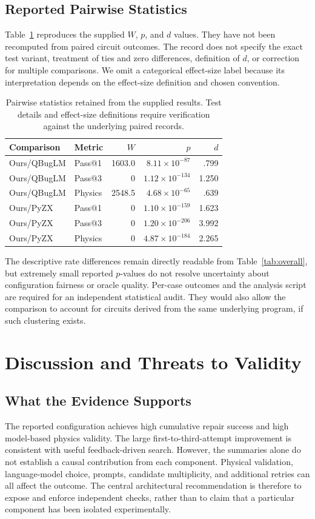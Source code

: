 \documentclass[conference]{IEEEtran}
\begin{document}
\subsection{Reported Pairwise Statistics}
Table~\ref{tab:stats} reproduces the supplied $W$, $p$, and $d$ values. They have not been recomputed from paired circuit outcomes. The record does not specify the exact test variant, treatment of ties and zero differences, definition of $d$, or correction for multiple comparisons. We omit a categorical effect-size label because its interpretation depends on the effect-size definition and chosen convention.

\begin{table}[t]
\caption{Pairwise statistics retained from the supplied results. Test details and effect-size definitions require verification against the underlying paired records.}
\label{tab:stats}
\centering\scriptsize
\begin{tabular}{@{}llrrr@{}}
\toprule
Comparison & Metric & $W$ & $p$ & $d$\\
\midrule
Ours/QBugLM & Pass@1 & 1603.0 & $8.11\times10^{-87}$ & .799\\
Ours/QBugLM & Pass@3 & 0 & $1.12\times10^{-134}$ & 1.250\\
Ours/QBugLM & Physics & 2548.5 & $4.68\times10^{-65}$ & .639\\
Ours/PyZX & Pass@1 & 0 & $1.10\times10^{-159}$ & 1.623\\
Ours/PyZX & Pass@3 & 0 & $1.20\times10^{-206}$ & 3.992\\
Ours/PyZX & Physics & 0 & $4.87\times10^{-184}$ & 2.265\\
\bottomrule
\end{tabular}
\end{table}

The descriptive rate differences remain directly readable from Table~\ref{tab:overall}, but extremely small reported $p$-values do not resolve uncertainty about configuration fairness or oracle quality. Per-case outcomes and the analysis script are required for an independent statistical audit. They would also allow the comparison to account for circuits derived from the same underlying program, if such clustering exists.

\section{Discussion and Threats to Validity}
\subsection{What the Evidence Supports}
The reported configuration achieves high cumulative repair success and high model-based physics validity. The large first-to-third-attempt improvement is consistent with useful feedback-driven search. However, the summaries alone do not establish a causal contribution from each component. Physical validation, language-model choice, prompts, candidate multiplicity, and additional retries can all affect the outcome. The central architectural recommendation is therefore to expose and enforce independent checks, rather than to claim that a particular component has been isolated experimentally.
\end{document}
